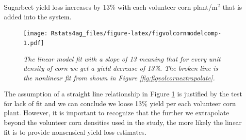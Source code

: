 \documentclass[letterpaper,]{book}
\newenvironment{Shaded}{\begin{snugshade}}{\end{snugshade}}
\newcommand{\DataTypeTok}[1]{\textcolor[rgb]{0.13,0.29,0.53}{#1}}
\newcommand{\DecValTok}[1]{\textcolor[rgb]{0.00,0.00,0.81}{#1}}
\newcommand{\FloatTok}[1]{\textcolor[rgb]{0.00,0.00,0.81}{#1}}
\newcommand{\KeywordTok}[1]{\textcolor[rgb]{0.13,0.29,0.53}{\textbf{#1}}}
\newcommand{\NormalTok}[1]{#1}
\newcommand{\OperatorTok}[1]{\textcolor[rgb]{0.81,0.36,0.00}{\textbf{#1}}}
\newcommand{\StringTok}[1]{\textcolor[rgb]{0.31,0.60,0.02}{#1}}
\begin{document}
Sugarbeet yield loss increases by 13\% with each volunteer corn plant/m\(^2\) that is added into the system.



\begin{Shaded}
\end{Shaded}

\begin{figure}
\centering
\texttt{[image: Rstats4ag\_files/figure-latex/figvolcornmodelcomp-1.pdf]}
\caption{\label{fig:figvolcornmodelcomp}\emph{The linear model fit with a slope of 13 meaning that for every unit density of corn we get a yield decrease of 13\%. The broken line is the nonlinear fit from shown in Figure \ref{fig:figvolcornextrapolate}.}}
\end{figure}

The assumption of a straight line relationship in Figure \ref{fig:figvolcornmodelcomp} is justified by the test for lack of fit and we can conclude we loose 13\% yield per each volunteer corn plant. However, it is important to recognize that the further we extrapolate beyond the volunteer corn densities used in the study, the more likely the linear fit is to provide nonsensical yield loss estimates.
\end{document}
